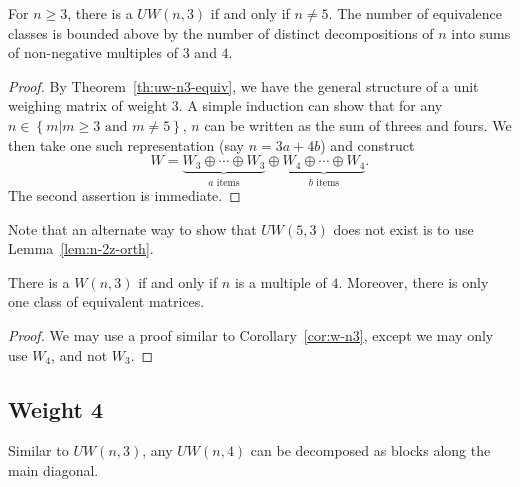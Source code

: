 \begin{corollary} \label{cor:w-n3}
 For $n \geq 3$, there is a $UW(n,3)$ if and only if $n \neq 5$. The number of equivalence classes  is bounded above by the number of distinct decompositions of $n$ into sums of non-negative multiples of $3$ and $4$.
 \begin{proof}
  By Theorem~\ref{th:uw-n3-equiv}, we have the general structure of a unit weighing matrix of weight 3. A simple induction can show that for any $n \in \left\{m | m \geq 3 \text{ and } m \neq 5\right\}$, $n$ can be written as the sum of threes and fours. We then take one such representation (say $n = 3a + 4b$) and construct $$W = \underbrace{W_3 \oplus \cdots \oplus W_3}_{a \text{ items}} \oplus \underbrace{W_4 \oplus \cdots \oplus W_4}_{b \text{ items}}.$$ The second assertion is immediate.
 \end{proof}

\end{corollary}

Note that an alternate way to show that $UW(5,3)$ does not exist is to use  Lemma~\ref{lem:n-2z-orth}.

\begin{corollary} \label{cor:w-n3-order}
 There is a $W(n,3)$ if and only if $n$ is a  multiple of $4$. Moreover, there is only one class of equivalent matrices.
 \begin{proof}
  We may use a proof similar to Corollary~\ref{cor:w-n3}, except we may only use $W_4$, and not $W_3$.
 \end{proof}

\end{corollary}

\subsection{Weight 4}
\label{subsec:w4}

Similar to $UW(n,3)$, any $UW(n,4)$ can be decomposed as blocks along the main diagonal.

